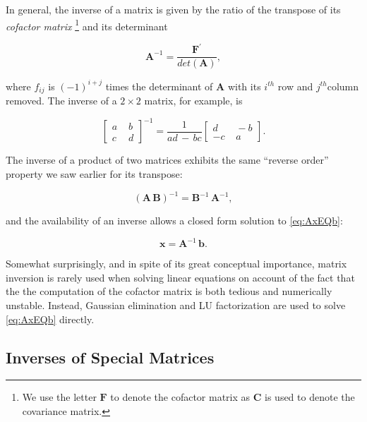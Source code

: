 \documentclass[graybox,envcountchap,sectrefs]{svmono}\usepackage[]{graphicx}\usepackage[]{xcolor}
\begin{document}
\begin{appendices}
In general, the inverse of a matrix is given by the ratio of the transpose
of its \emph{cofactor matrix} \footnote{We use the letter $\mathrm{\mathbf{F}}$ to denote the cofactor matrix
as $\mathrm{\mathbf{C}}$ is used to denote the covariance matrix.} and its determinant

\begin{equation}
\mathrm{\mathbf{A}}^{-1}=\frac{\mathrm{\mathbf{F}}^{\prime}}{det\left(\mathrm{\mathbf{A}}\right)},\label{eq:CofactorExpansion}
\end{equation}

where $f_{ij}$ is $\left(-1\right)^{i+j}$ times the determinant
of $\mathrm{\mathbf{A}}$ with its $i^{th}$ row and $j^{th}$column
removed. The inverse of a $2\times2$ matrix, for example, is

\begin{equation}
\left[\begin{array}{cc}
a\, & \,b\\
c\, & \,d
\end{array}\right]^{-1}=\frac{1}{ad\,-\,bc}\left[\begin{array}{rr}
d\, & \,-b\\
-c\, & \,a
\end{array}\right].\label{eq:TwoByTwoInverse}
\end{equation}

The inverse of a product of two matrices exhibits the same ``reverse
order'' property we saw earlier for its transpose:

\begin{equation}
\left(\mathrm{\mathbf{A\,B}}\right)^{-1}=\mathrm{\mathbf{B}}^{-1}\,\mathrm{\mathbf{A}}^{-1},\label{eq:ABinverse}
\end{equation}

and the availability of an inverse allows a closed form solution to
\eqref{eq:AxEQb}:

\begin{equation}
\mathrm{\mathbf{x}}=\mathrm{\mathbf{A}}^{-1}\,\mathrm{\mathbf{b}}.\label{eq:xEqAinverseB}
\end{equation}

Somewhat surprisingly, and in spite of its great conceptual importance,
matrix inversion is rarely used when solving linear equations on account
of the fact that the the computation of the cofactor matrix is both
tedious and numerically unstable. Instead, Gaussian elimination and
LU factorization are used to solve \eqref{eq:AxEQb} directly.

\subsection{Inverses of Special Matrices }


\end{appendices}
\end{document}
